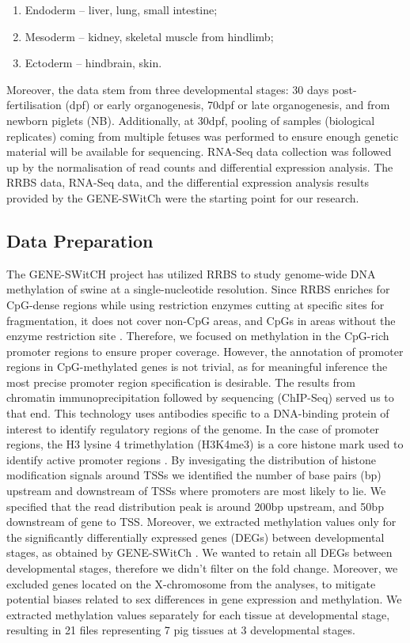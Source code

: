 \documentclass[
	a4paper, %
	10pt, %
	unnumberedsections, %
	twoside, %
]{LTJournalArticle}
\begin{document}
\begin{enumerate}
	\item Endoderm – liver, lung, small intestine;
	\item Mesoderm – kidney, skeletal muscle from hindlimb;
	\item Ectoderm – hindbrain, skin.
\end{enumerate}

\noindent Moreover, the data stem from three developmental stages: 
30 days post-fertilisation (dpf) or early organogenesis, 70dpf or late organogenesis, 
and from newborn piglets (NB). Additionally, at 30dpf, pooling of 
samples (biological replicates) coming from multiple fetuses 
was performed to ensure enough genetic 
material will be available for sequencing. RNA-Seq data collection was followed up by the normalisation 
of read counts and differential expression analysis. 
The RRBS data, RNA-Seq data, and the differential expression analysis results provided by the 
GENE-SWitCh were the starting point for our research.

\subsection{\normalsize Data Preparation}
The GENE-SWitCH project has utilized RRBS to study genome-wide DNA methylation of 
swine at a 
single-nucleotide resolution. Since RRBS enriches for CpG-dense regions while 
using restriction enzymes cutting at specific sites for fragmentation, 
it does not cover non-CpG areas, and CpGs in areas without the enzyme restriction 
site \autocite{kalavacharla2017a, smith2009a}. Therefore, we focused 
on methylation in the CpG-rich promoter regions to ensure proper coverage.
However, the annotation of promoter regions in CpG-methylated genes is not trivial, 
as for meaningful inference the most precise promoter region specification is desirable. 
The results from chromatin immunoprecipitation followed by sequencing 
(ChIP-Seq) served us to that end. This technology uses antibodies specific to a 
DNA-binding protein of interest to identify regulatory regions 
of the genome. In the case of promoter regions, the H3 lysine 4 trimethylation (H3K4me3) 
is a core histone mark used to identify active promoter regions \autocite{nakato2021a}. 
By invesigating the distribution of histone modification signals around TSSs we 
identified the number of base pairs (bp) upstream and downstream of TSSs where 
promoters are most likely to lie. 
We specified that the read distribution peak is around 200bp upstream, and 50bp 
downstream of gene to TSS.
Moreover, we extracted methylation values only for the significantly differentially 
expressed genes (DEGs) between developmental stages, 
as obtained by GENE-SWitCh \autocite{acloque2022a}. We wanted to retain all DEGs between developmental 
stages, therefore we didn't filter on the fold change.
Moreover, we excluded genes located on the X-chromosome from the analyses,
to mitigate potential biases related to sex differences in gene expression 
and methylation.
We extracted methylation values separately for each tissue at developmental stage, 
resulting in 21 files representing 7 pig tissues at 3 developmental stages.\newline
\end{document}
